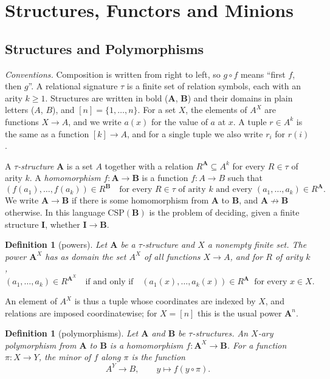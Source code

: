 \documentclass[11pt]{article}
\theoremstyle{plain}
\newtheorem{definition}[theorem]{Definition}
\theoremstyle{definition}
\newcommand{\bA}{\mathbf{A}}
\newcommand{\bB}{\mathbf{B}}
\newcommand{\bI}{\mathbf{I}}
\newcommand{\CSP}{\mathrm{CSP}}
\begin{document}
\section{Structures, Functors and Minions}\label{sec:min}

\subsection{Structures and Polymorphisms}\label{sec:str}

\emph{Conventions.} Composition is written from right to left, so $g\circ f$ means ``first $f$, then $g$''. A relational signature $\tau$ is a finite set of relation symbols, each with an arity $k\geq 1$. Structures are written in bold ($\bA$, $\bB$) and their domains in plain letters ($A$, $B$), and $[n]=\{1,\dots,n\}$. For a set $X$, the elements of $A^X$ are functions $X\to A$, and we write $a(x)$ for the value of $a$ at $x$. A tuple $r\in A^k$ is the same as a function $[k]\to A$, and for a single tuple we also write $r_i$ for $r(i)$.

A \emph{$\tau$-structure} $\bA$ is a set $A$ together with a relation $R^{\bA}\subseteq A^k$ for every $R\in\tau$ of arity $k$. A \emph{homomorphism} $f\colon\bA\to\bB$ is a function $f\colon A\to B$ such that
\[
(f(a_1),\dots,f(a_k))\in R^{\bB}\quad\text{for every } R\in\tau \text{ of arity } k \text{ and every } (a_1,\dots,a_k)\in R^{\bA}.
\]
We write $\bA\to\bB$ if there is some homomorphism from $\bA$ to $\bB$, and $\bA\not\to\bB$ otherwise. In this language $\CSP(\bB)$ is the problem of deciding, given a finite structure $\bI$, whether $\bI\to\bB$.

\begin{definition}[powers]
Let $\bA$ be a $\tau$-structure and $X$ a nonempty finite set. The \emph{power} $\bA^X$ has as domain the set $A^X$ of all functions $X\to A$, and for $R$ of arity $k$,
\[
(a_1,\dots,a_k)\in R^{\bA^X}\quad\text{if and only if}\quad(a_1(x),\dots,a_k(x))\in R^{\bA}\ \text{ for every } x\in X.
\]
\end{definition}

An element of $A^X$ is thus a tuple whose coordinates are indexed by $X$, and relations are imposed coordinatewise; for $X=[n]$ this is the usual power $\bA^n$.

\begin{definition}[polymorphisms]\label{def:pol}
Let $\bA$ and $\bB$ be $\tau$-structures. An \emph{$X$-ary polymorphism} from $\bA$ to $\bB$ is a homomorphism $f\colon\bA^X\to\bB$. For a function $\pi\colon X\to Y$, the \emph{minor} of $f$ along $\pi$ is the function
\[
A^Y\to B,\qquad y\mapsto f(y\circ\pi).
\]
\end{definition}
\end{document}
